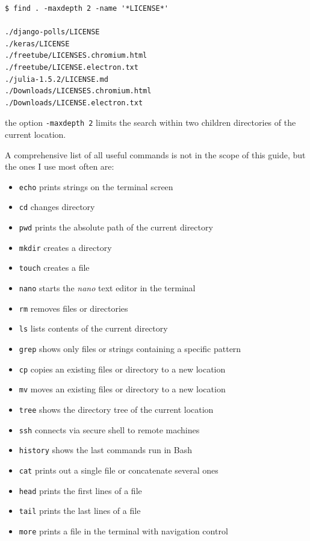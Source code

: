\documentclass{book}
\begin{document}
\begin{lstlisting}
$ find . -maxdepth 2 -name '*LICENSE*'

./django-polls/LICENSE
./keras/LICENSE
./freetube/LICENSES.chromium.html
./freetube/LICENSE.electron.txt
./julia-1.5.2/LICENSE.md
./Downloads/LICENSES.chromium.html
./Downloads/LICENSE.electron.txt
\end{lstlisting}

the option \texttt{-maxdepth 2} limits the search within two children directories of the current location.

A comprehensive list of all useful commands is not in the scope of this guide, but the ones I use most often are:

\begin{itemize}
   \item[] \texttt{echo} prints strings on the terminal screen
   \item[] \texttt{cd} changes directory
   \item[] \texttt{pwd} prints the absolute path of the current directory
   \item[] \texttt{mkdir} creates a directory
   \item[] \texttt{touch} creates a file
   \item[] \texttt{nano} starts the \textit{nano} text editor in the terminal 
   \item[] \texttt{rm} removes files or directories
   \item[] \texttt{ls} lists contents of the current directory
   \item[] \texttt{grep} shows only files or strings containing a specific pattern
   \item[] \texttt{cp} copies an existing files or directory to a new location
   \item[] \texttt{mv} moves an existing files or directory to a new location
   \item[] \texttt{tree} shows the directory tree of the current location
   \item[] \texttt{ssh} connects via secure shell to remote machines
   \item[] \texttt{history} shows the last commands run in Bash
   \item[] \texttt{cat} prints out a single file or concatenate several ones
   \item[] \texttt{head} prints the first lines of a file
   \item[] \texttt{tail} prints the last lines of a file
   \item[] \texttt{more} prints a file in the terminal with navigation control

\end{itemize}
\end{document}
